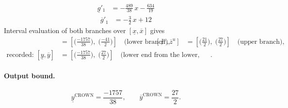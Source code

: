 \documentclass[11pt]{article}
\begin{document}
\begin{align*}
\underline{g}'_{1} &= -\frac{489}{38}\,x - \frac{634}{19}
\end{align*}
\begin{align*}
\overline{g}'_{1} &= -\frac{3}{2}\,x + 12
\end{align*}
Interval evaluation of both branches over $[\underline{x}, \overline{x}]$ gives
\begin{align*}
[\underline{z}^{\ell}, \overline{z}^{\ell}] &= [\bigl(\frac{-1757}{38}\bigr),\; \bigl(\frac{-41}{2}\bigr)] \quad\text{(lower branch)}, & [\underline{z}^{u}, \overline{z}^{u}] &= [\bigl(\frac{21}{2}\bigr),\; \bigl(\frac{27}{2}\bigr)] \quad\text{(upper branch)}, \\
\text{recorded: } [\underline{y}, \overline{y}] &= [\bigl(\frac{-1757}{38}\bigr),\; \bigl(\frac{27}{2}\bigr)] \quad\text{(lower end from the lower, upper end from the upper branch)}.
\end{align*}
\paragraph{Output bound.}
\begin{equation*}
\underline{y}^{\text{CROWN}} = \frac{-1757}{38}, \qquad \overline{y}^{\text{CROWN}} = \frac{27}{2}.
\end{equation*}
\end{document}
